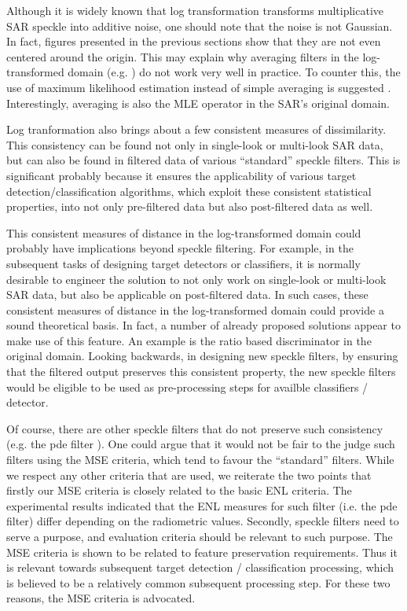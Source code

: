 \documentclass[journal]{IEEEtran}
\begin{document}
Although it is widely known that log transformation transforms multiplicative SAR speckle into additive noise, 
	one should note that the noise is not Gaussian.
In fact, figures presented in the previous sections show that 
	they are not even centered around the origin. 
This may explain why averaging filters in the log-transformed domain (e.g. \cite{Arsenault_JOptSocAm_1976}) do not work very well in practice.
To counter this, the use of maximum likelihood estimation instead of simple averaging is suggested \cite{Le_2011_ACRS}. 
Interestingly, averaging is also the MLE operator in the SAR's original domain.

Log tranformation also brings about a few consistent measures of dissimilarity.
This consistency can be found not only in single-look or multi-look SAR data, 
	but can also be found in filtered data of various ``standard'' speckle filters.
This is significant probably because it ensures the applicability of various target detection/classification algorithms, 
	which exploit these consistent statistical properties, 
	into not only pre-filtered data but also post-filtered data as well.

This consistent measures of distance in the log-transformed domain could probably have implications beyond speckle filtering.
For example, in the subsequent tasks of designing target detectors or classifiers, 
	it is normally desirable to engineer the solution to not only work on single-look or multi-look SAR data,
	but also be applicable on post-filtered data.
In such cases, these consistent measures of distance in the log-transformed domain could provide a sound theoretical basis.
In fact, a number of already proposed solutions appear to make use of this feature. 
An example is the ratio based discriminator in the original domain.
Looking backwards, in designing new speckle filters, by ensuring that the filtered output preserves this consistent property,
	the new speckle filters would be eligible to be used as pre-processing steps for availble classifiers / detector.

Of course, there are other speckle filters that do not preserve such consistency (e.g. the pde filter \cite{You_TIP_2000}).
One could argue that it would not be fair to the judge such filters using the MSE criteria, 
	which tend to favour the ``standard'' filters.
While we respect any other criteria that are used, we reiterate the two points that firstly
our MSE criteria is closely related to the basic ENL criteria.
The experimental results indicated that the ENL measures for such filter (i.e. the pde filter) differ depending on the radiometric values.
Secondly, speckle filters need to serve a purpose, and evaluation criteria should be relevant to such purpose.
The MSE criteria is shown to be related to feature preservation requirements.
Thus it is relevant towards subsequent target detection / classification processing, 
	which is believed to be a relatively common subsequent processing step.
For these two reasons, the MSE criteria is advocated.
\end{document}

